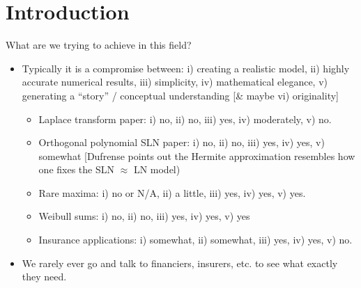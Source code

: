 \chapter{Introduction}

\setcounter{page}{1}

What are we trying to achieve in this field?
\begin{itemize}
	\item Typically it is a compromise between: i) creating a realistic model, ii) highly accurate numerical results, iii) simplicity, iv) mathematical elegance, v) generating a ``story'' / conceptual understanding [\& maybe vi) originality]
	\begin{itemize}
		\item Laplace transform paper: i) no, ii) no, iii) yes, iv) moderately, v) no.
		\item Orthogonal polynomial SLN paper: i) no, ii) no, iii) yes, iv) yes, v) somewhat [Dufrense points out the Hermite approximation resembles how one fixes the SLN $\approx$ LN model)
		\item Rare maxima: i) no or N/A, ii) a little, iii) yes, iv) yes, v) yes.
		\item Weibull sums: i) no, ii) no, iii) yes, iv) yes, v) yes
		\item Insurance applications: i) somewhat, ii) somewhat, iii) yes, iv) yes, v) no.
	\end{itemize}
	\item We rarely ever go and talk to financiers, insurers, etc. to see what exactly they need.
\end{itemize}

